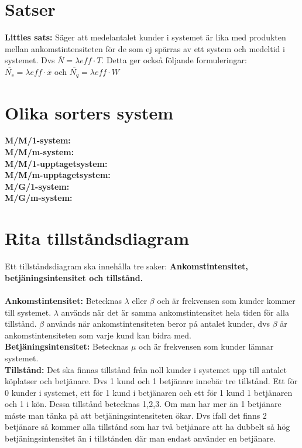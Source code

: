 \documentclass{article}
\begin{document}
	\section*{Satser}
	{ \bf Littles sats:} Säger att medelantalet kunder i systemet är lika med produkten mellan ankomstintensiteten för de som ej spärras av ett system och medeltid i systemet. Dvs $\overline{N}=\lambda{eff}\cdot T$. Detta ger också följande formuleringar:\\
	$\overline{N_s}=\lambda{eff}\cdot \overline{x}$ och $\overline{N_q}=\lambda{eff}\cdot W$
	\section*{Olika sorters system}
	{\bf M/M/1-system:}\\
	{\bf M/M/m-system:}\\
	{\bf M/M/1-upptagetsystem:}\\
	{\bf M/M/m-upptagetsystem:}\\
	{\bf M/G/1-system:}\\
	{\bf M/G/m-system:}\\	
 	\section*{Rita tillståndsdiagram}
	Ett tillståndsdiagram ska innehålla tre saker: {\bf Ankomstintensitet, betjäningsintensitet och tillstånd.}\\\\
	{\bf Ankomstintensitet:} Betecknas $\lambda$ eller $\beta$ och är frekvensen som kunder kommer till systemet. $\lambda$ används när det är samma ankomstintensitet hela tiden för alla tillstånd. $\beta$ används när ankomstintensiteten beror på antalet kunder, dvs $\beta$ är ankomstintensiteten som varje kund kan bidra med.\\
	{\bf Betjäningsintensitet:} Betecknas $\mu$ och är frekvensen som kunder lämnar systemet.\\
	{\bf Tillstånd:} Det ska finnas tillstånd från noll kunder i systemet upp till antalet köplatser och betjänare. Dvs 1 kund och 1 betjänare innebär tre tillstånd. Ett för 0 kunder i systemet, ett för 1 kund i betjänaren och ett för 1 kund 1 betjänaren och 1 i kön. Dessa tillstånd betecknas 1,2,3. Om man har mer än 1 betjänare måste man tänka på att betjäningsintensiteten ökar. Dvs ifall det finns 2 betjänare så kommer alla tillstånd som har två betjänare att ha dubbelt så hög betjäningsintensitet än i tillstånden där man endast använder en betjänare. \\
\end{document}
